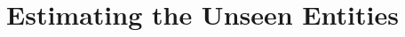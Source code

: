 \documentclass{vldb}
\newcommand{\squishlist}{
   \begin{list}{$\bullet$}
    {
      \setlength{\itemsep}{0pt}
      \setlength{\parsep}{3pt}
      \setlength{\topsep}{3pt}
      \setlength{\partopsep}{0pt}
      \setlength{\leftmargin}{1.5em}
      \setlength{\labelwidth}{1em}
      \setlength{\labelsep}{0.5em} } }
\newcommand{\squishend}{
    \end{list}  }
\begin{document}
%

\section{Estimating the Unseen Entities}
\label{sec:estimation}

\end{document}
